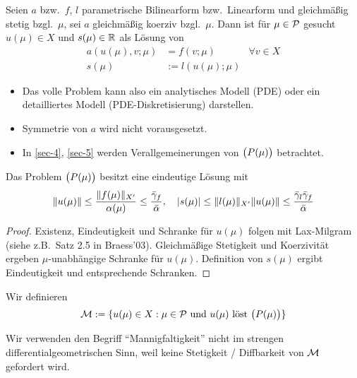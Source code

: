 \begin{defn}
	Seien $a$ bzw.\ $f$, $l$ parametrische Bilinearform bzw.\ Linearform und gleichmäßig stetig bzgl.\ $\mu$, sei $a$ gleichmäßig koerziv bzgl.\ $\mu$.
	Dann ist für $\mu \in \mathcal{P}$ gesucht $u(\mu) \in X$ und $s(\mu) \in \mathbb{R}$ als Lösung von
	\begin{align*}
		a(u(\mu),v;\mu) &= f(v;\mu) &\forall v \in X\\
		s(\mu) &:= l(u(\mu);\mu)
	\end{align*}
\end{defn}

\begin{bem} \beginwithlistbem
	\begin{itemize}
		\item Das volle Problem kann also ein analytisches Modell (PDE) oder ein detailliertes Modell (PDE-Diskretisierung) darstellen.
		\item Symmetrie von $a$ wird nicht vorausgesetzt.
		\item In \ref{sec-4}, \ref{sec-5} werden Verallgemeinerungen von $\big(P(\mu)\big)$ betrachtet.
	\end{itemize}
\end{bem}

\begin{satz}
	Das Problem $\big(P(\mu)\big)$ besitzt eine eindeutige Lösung mit
	\[
		\|u(\mu)\| \leq \frac{\|f(\mu)\|_{X'}}{\alpha(\mu)} \leq \frac{\bar \gamma_f}{\bar \alpha}, \quad |s(\mu)| \leq \|l(\mu)\|_{X'} \|u(\mu)\| \leq \frac{\bar \gamma_l \bar \gamma_f}{\bar\alpha}
	\]

	\begin{proof}
		Existenz, Eindeutigkeit und Schranke für $u(\mu)$ folgen mit Lax-Milgram (siehe z.B.\ Satz 2.5 in Braess'03).
		Gleichmäßige Stetigkeit und Koerzivität ergeben $\mu$-unabhängige Schranke für $u(\mu)$.
		Definition von $s(\mu)$ ergibt Eindeutigkeit und entsprechende Schranken.
	\end{proof}
\end{satz}

\begin{defn}[Lösungsmannigfaltigkeit]
	Wir definieren
	\[
		\mathcal{M} := \{ u(\mu) \in X : \mu \in \mathcal{P} \text{ und } u(\mu) \text{ löst } \big(P(\mu)\big) \}
	\]
\end{defn}

\begin{bem}
	Wir verwenden den Begriff ``Mannigfaltigkeit'' nicht im strengen differentialgeometrischen Sinn, weil keine Stetigkeit / Diffbarkeit von $\mathcal{M}$ gefordert wird.
\end{bem}

